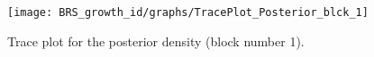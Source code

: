 \begin{figure}[H]
\centering
  \texttt{[image: BRS\_growth\_id/graphs/TracePlot\_Posterior\_blck\_1]}\\
    \caption{Trace plot for the posterior density (block number 1).}
\end{figure}
